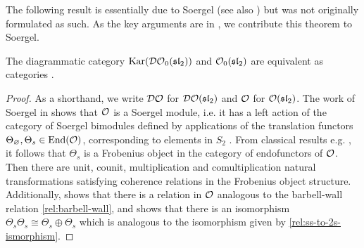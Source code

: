 The following result is essentially due to Soergel \cite[Endomorhihsmensatz 7, Struktursatz 9 and Section 2.4]{soergel-category-O} (see also \cite{soergel-combinatorics-of-hcbim}) but was not originally formulated as such. As the key arguments are in \cite{soergel-category-O}, we contribute this theorem to Soergel.

\begin{theorem}
    The diagrammatic category $\operatorname{Kar}(\mathcal{DO}_0(\operatorname{\mathfrak{sl}}_2))$ and $\mathcal{O}_0(\operatorname{\mathfrak{sl}}_2)$ are equivalent as categories .
\end{theorem}


\begin{proof}
    As a shorthand, we write $\mathcal{DO}$ for $\mathcal{DO}(\operatorname{\mathfrak{sl}}_2)$ and $\mathcal{O}$ for $\mathcal{O}(\operatorname{\mathfrak{sl}}_2)$. The work of Soergel in \cite[Section 2.4]{soergel-category-O} shows that $\mathcal{O}$ is a Soergel module, i.e. it has a left action of the category of Soergel bimodules defined by applications of the translation functors $\Theta_\varnothing, \Theta_s \in \operatorname{End}(\mathcal{O})$, corresponding to elements in $S_2$ . From classical results e.g. \cite[Proposition 5.8.1 and Lemma 5.8.4]{mazorchuk-lectures-sl2-modules} , it follows that $\Theta_s$ is a Frobenius object in the category of endofunctors of $\mathcal{O}$. Then there are unit, counit, multiplication and comultiplication natural transformations satisfying coherence relations in the Frobenius object structure. Additionally, \cite[Section 2.4]{soergel-category-O} shows that there is a relation in $\mathcal{O}$ analogous to the barbell-wall relation \eqref{rel:barbell-wall}, and \cite[Proposition 5.8.4]{mazorchuk-lectures-sl2-modules} shows that there is an isomorphism $\Theta_s \Theta_s \cong \Theta_s \oplus \Theta_s$  which is analogous to the isomorphism given by \eqref{rel:ss-to-2s-ismorphism}.



\end{proof}
